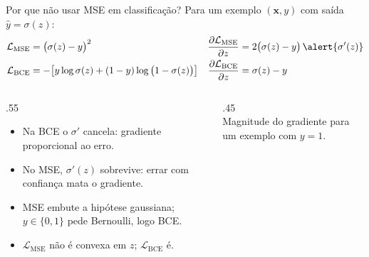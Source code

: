 \documentclass[aspectratio=169,xcolor=dvipsnames]{beamer}
\begin{document}
  \begin{frame}{Por que não usar MSE em classificação?}
    Para um exemplo $(\mathbf{x}, y)$ com saída $\hat y=\sigma(z)$:
    \vspace{-0.4em}
    \begin{align*}
      \mathcal{L}_{\text{MSE}} &= \big(\sigma(z)-y\big)^{2}
        & \frac{\partial \mathcal{L}_{\text{MSE}}}{\partial z} &= 2\big(\sigma(z)-y\big)\,\alert{\sigma'(z)} \\
      \mathcal{L}_{\text{BCE}} &= -\big[y\log\sigma(z) + (1-y)\log\big(1-\sigma(z)\big)\big]
        & \frac{\partial \mathcal{L}_{\text{BCE}}}{\partial z} &= \sigma(z)-y
    \end{align*}
    \vspace{-0.6em}
    \begin{columns}
      \begin{column}{.55\linewidth}
        \begin{itemize}
          \item Na BCE o $\sigma'$ cancela: gradiente proporcional ao erro.
          \item No MSE, $\sigma'(z)$ sobrevive: errar com confiança \alert{mata} o gradiente.
          \item MSE embute a hipótese gaussiana; $y\in\{0,1\}$ pede Bernoulli, logo BCE.
          \item $\mathcal{L}_{\text{MSE}}$ não é convexa em $z$; $\mathcal{L}_{\text{BCE}}$ é.
        \end{itemize}
      \end{column}
      \begin{column}{.45\linewidth}
        \centering
        \\
        \footnotesize Magnitude do gradiente para um exemplo com $y=1$.
      \end{column}
    \end{columns}
  \end{frame}
\end{document}
